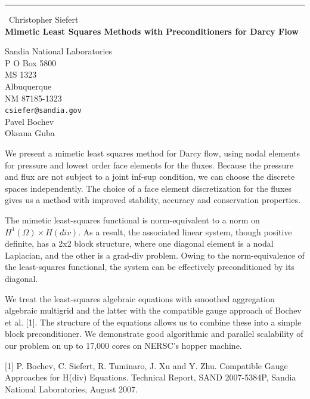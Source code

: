 \documentclass{report}
\begin{document}
\begin{center}
\rule{6in}{1pt} \
{\large Christopher Siefert \\
{\bf Mimetic Least Squares Methods with Preconditioners for Darcy Flow}}

Sandia National Laboratories \\ P O Box 5800 \\ MS 1323 \\ Albuquerque \\ NM 87185-1323
\\
{\tt csiefer@sandia.gov}\\
Pavel Bochev\\
Oksana Guba\end{center}

We present a mimetic least squares method for Darcy flow,
using nodal elements for pressure and lowest order face elements for the
fluxes. Because the pressure and flux are not subject to a joint inf-sup
condition, we can choose the discrete spaces independently. The choice of
a face element discretization for the fluxes gives us a method with
improved stability, accuracy and conservation properties.

The mimetic least-squares functional is norm-equivalent to a norm on
$H^1(\Omega)\times H(div)$. As a result, the associated linear system,
though positive definite, has a 2x2 block structure, where one diagonal
element is a nodal Laplacian, and the other is a grad-div problem. Owing
to the norm-equivalence of the least-squares functional, the system can
be effectively preconditioned by its diagonal.

We treat the least-squares algebraic equations with smoothed
aggregation algebraic multigrid and the latter with the compatible
gauge approach of Bochev et al. [1]. The structure of the equations
allows us to combine these into a simple block preconditioner. We
demonstrate good algorithmic and parallel scalability of our problem on
up to 17,000 cores on NERSC's hopper machine.

[1] P. Bochev, C. Siefert, R. Tuminaro, J. Xu and Y. Zhu. Compatible
Gauge Approaches for H(div) Equations. Technical Report, SAND 2007-5384P,
Sandia National Laboratories, August 2007.
\end{document}
